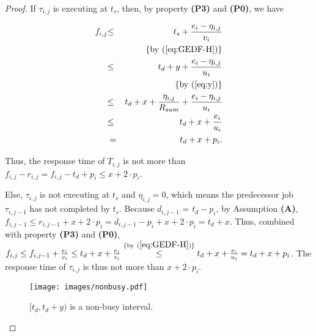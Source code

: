 \documentclass[Times, 10pt,twocolumn]{article}
\theoremstyle{definition}
\begin{document}
\begin{proof}
\noindent If $\tau_{i,j}$ is executing at $t_s$, then, by property \textbf{(P3)} and \textbf{(P0)}, we have

\begin{eqnarray*}
f_{i,j}  &{\leq}& t_s + \frac{e_i-\eta_{i,j}}{v_i}  \\
&&{\lbrace \rm{by}~(\ref{eq:GEDF-H}) \rbrace}\\ 
&{\leq}& t_d + y +\frac{e_i-\eta_{i,j}}{u_i} \\
&&{\lbrace \rm{by}~(\ref{eq:y}) \rbrace} \\
&{\leq}& t_d + x+  \frac{\eta_{i,j}}{R_{sum}}+\frac{e_i-\eta_{i,j}}{u_i} \\
&{\leq}& t_d + x + \frac{e_i}{u_i} \\
& = & t_d+x+p_i.
\end{eqnarray*}


Thus, the response time of $T_{i,j}$ is not more than $f_{i,j}-r_{i,j}= f_{i,j}-t_d+p_i \leq x+ 2 \cdot p_i$.

Else, $\tau_{i,j}$ is not executing at $t_s$ and $\eta_{i,j}= 0$, which means the predecessor job $\tau_{i,j-1}$ has not completed by $t_s$. Because $d_{i,j-1}$ = $t_d-p_{i}$, by Assumption \textbf{(A)}, $f_{i,j-1} \leq r_{i,j-1} + x+ 2 \cdot p_i =d_{i,j-1}-p_i+x+2 \cdot p_i = t_d+x$. Thus, combined with property \textbf{(P3)} and \textbf{(P0)}, $f_{i,j}\leq f_{i,j-1}+\frac{e_i}{v_i}\leq t_{d}+x+\frac{e_i}{v_i} 
\stackrel{\lbrace \rm{by}~(\ref{eq:GEDF-H}) \rbrace}{\leq}
t_{d}+x+\frac{e_i}{u_i}= t_d+x+p_i$. The response time of $\tau_{i,j}$ is thus not more than $x+ 2 \cdot p_i$. \qedhere


\begin{figure}[t]
	\begin{center}
	\texttt{[image: images/nonbusy.pdf]} 
	\end{center} 
\vspace{-2mm}
\caption{\small $[t_d, t_d+y)$ is a non-busy interval.}
\vspace{-2mm}
\label{fig:nonbusy}
\end{figure}

\end{proof}
\end{document}
